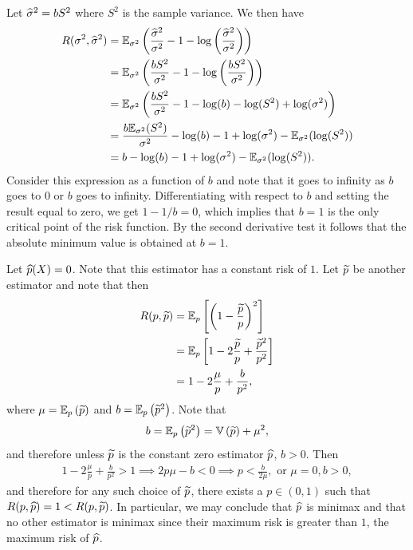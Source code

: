 \begin{ex}
  Let $\widehat{\sigma}^2=bS^2$ where $S^2$ is the sample variance. We then have
  \begin{align*}
    R(\sigma^2,\widehat{\sigma}^2)
     & =\mathbb{E}_{\sigma^2}\left(\frac{\widehat{\sigma}^2}{\sigma^2}-1-\log\left(\frac{\widehat{\sigma}^2}{\sigma^2}\right) \right) \\
     & =\mathbb{E}_{\sigma^2}\left(\frac{bS^2}{\sigma^2}-1-\log\left(\frac{bS^2}{\sigma^2}\right) \right)               \\
     & =\mathbb{E}_{\sigma^2}\left(\frac{bS^2}{\sigma^2}-1-\log(b)-\log(S^2)+\log(\sigma^2) \right)                     \\
     & =\frac{b\mathbb{E}_{\sigma^2}(S^2)}{\sigma^2}-\log(b)
    -1+\log(\sigma^2)
    -\mathbb{E}_{\sigma^2}(\log(S^2))                                                                                   \\
     & =b-\log(b)
    -1+\log(\sigma^2)
    -\mathbb{E}_{\sigma^2}(\log(S^2)).
  \end{align*}
  Consider this expression as a function of $b$ and note that it goes to
  infinity as $b$ goes to $0$ or $b$ goes to infinity. Differentiating with
  respect to $b$ and setting the result equal to zero, we get $1-1/b=0$, which
  implies that $b=1$ is the only critical point of the risk function. By the
  second derivative test it follows that the absolute minimum value is obtained
  at $b=1$.
\end{ex}

\begin{ex}
  Let $\widehat{p}(X)=0$. Note that this estimator has a constant risk of $1$. Let
  $\widetilde{p}$ be another estimator and note that then
  \begin{align*}
    R(p,\widetilde{p})
     & =\mathbb{E}_p\left[\left(1-\frac{\widetilde{p}}{p}\right)^2\right]         \\
     & =\mathbb{E}_p\left[1-2\frac{\widetilde{p}}{p}+\frac{\widetilde{p}^2}{p^2}\right] \\
     & =1-2\frac{\mu}{p}+\frac{b}{p^2},
  \end{align*}
  where $\mu=\mathbb{E}_p\left(\widetilde{p}\right)$ and
  $b=\mathbb{E}_p\left(\widetilde{p}^2\right)$. Note that
  \[
    b
    =\mathbb{E}_p\left(\widetilde{p}^2\right)
    =\mathbb{V}\left(\widetilde{p}\right)+\mu^2,
  \]
  and therefore unless $\widetilde{p}$ is the constant zero estimator $\widehat{p}$, $b>0$.
  Then
  \begin{align*}
    1-2\frac{\mu}{p}+\frac{b}{p^2}> 1
    \implies
    2p\mu-b<0
    \implies
    p<\frac{b}{2\mu},
    \text{ or }
    \mu=0, b>0,
  \end{align*}
  and therefore for any such choice of $\widetilde{p}$, there exists a $p\in (0, 1)$
  such that $R(p,\widehat{p})=1<R(p,\widetilde{p})$. In particular, we may conclude that
  $\widehat{p}$ is minimax and that no other estimator is minimax since their maximum
  risk is greater than $1$, the maximum risk of $\widehat{p}$.
\end{ex}

